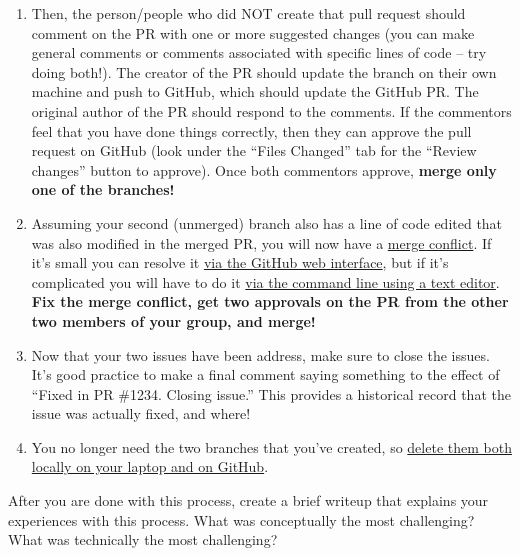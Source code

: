 \documentclass[10pt]{article}
\begin{document}
\begin{enumerate}
\item Then, the person/people who did NOT create that pull request
  should comment on the PR with one or more suggested
  changes (you can make general comments or comments associated with
  specific lines of code -- try doing both!).  The creator of the PR should update the
  branch on their own machine and push to GitHub, which should update
  the GitHub PR.  The original author of the PR should respond to the comments.  If the commentors feel
  that you have done things correctly, then they can approve the pull
  request on GitHub (look under the ``Files Changed'' tab for the
  ``Review changes'' button to approve).  Once both commentors approve, \textbf{merge only one of
    the branches!}

\item Assuming your second (unmerged) branch also has a line of code
   edited that was also modified in the merged PR, you will now have a
   \href{https://docs.github.com/en/pull-requests/collaborating-with-pull-requests/addressing-merge-conflicts/about-merge-conflicts}{merge
     conflict}.  If it's small you can resolve it
   \href{https://docs.github.com/en/pull-requests/collaborating-with-pull-requests/addressing-merge-conflicts/resolving-a-merge-conflict-on-github}{via
   the GitHub web interface}, but if it's complicated you will have to
 do it
 \href{https://docs.github.com/en/pull-requests/collaborating-with-pull-requests/addressing-merge-conflicts/resolving-a-merge-conflict-using-the-command-line}{via
 the command line using a text editor}.  \textbf{Fix the merge
 conflict, get two approvals on the PR from the other two members of
 your group, and merge!}

\item Now that your two issues have been address, make sure to close
  the issues.  It's good practice to make a final comment saying
  something to the effect of ``Fixed in PR \#1234.  Closing issue.''
  This provides a historical record that the issue was actually fixed,
  and where!

\item You no longer need the two branches that you've created, so
  \href{https://stackoverflow.com/questions/2003505/how-do-i-delete-a-git-branch-locally-and-remotely}{delete
    them both locally on your laptop and on GitHub}.  

\end{enumerate}

\noindent
After you are done with this process, create a brief writeup that
explains your experiences with this process.  What was conceptually
the most challenging?  What was technically the most challenging?
\end{document}
